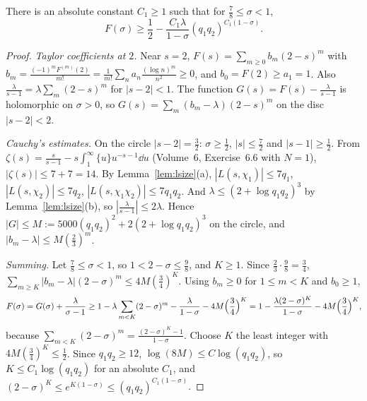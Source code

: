\begin{lemma}\label{lem:Fbound}
There is an absolute constant $C_1\ge1$ such that for $\frac78\le\sigma<1$,
\[
F(\sigma)\ge\frac12-\frac{C_1\lambda}{1-\sigma}(q_1q_2)^{C_1(1-\sigma)}.
\]
\end{lemma}
\begin{proof}
\emph{Taylor coefficients at $2$.} Near $s=2$, $F(s)=\sum_{m\ge0}b_m(2-s)^m$ with $b_m=\frac{(-1)^mF^{(m)}(2)}{m!}=\frac1{m!}\sum_na_n\frac{(\log n)^m}{n^2}\ge0$, and $b_0=F(2)\ge a_1=1$. Also $\frac\lambda{s-1}=\lambda\sum_m(2-s)^m$ for $|s-2|<1$. The function $G(s)=F(s)-\frac\lambda{s-1}$ is holomorphic on $\sigma>0$, so
$G(s)=\sum_m(b_m-\lambda)(2-s)^m$ on the disc $|s-2|<2$.

\emph{Cauchy's estimates.} On the circle $|s-2|=\frac32$: $\sigma\ge\frac12$, $|s|\le\frac72$ and $|s-1|\ge\frac12$. From $\zeta(s)=\frac s{s-1}-s\int_1^\infty\{u\}u^{-s-1}\dd u$ (Volume~6, Exercise~6.6 with $N=1$), $|\zeta(s)|\le7+7=14$. By Lemma~\ref{lem:lsize}(a), $|L(s,\chi_1)|\le7q_1$, $|L(s,\chi_2)|\le7q_2$, $|L(s,\chi_1\chi_2)|\le7q_1q_2$. And $\lambda\le(2+\log q_1q_2)^3$ by Lemma~\ref{lem:lsize}(b), so $|\frac\lambda{s-1}|\le2\lambda$.
Hence $|G|\le M:=5000(q_1q_2)^2+2(2+\log q_1q_2)^3$ on the circle, and $|b_m-\lambda|\le M(\frac23)^m$.

\emph{Summing.} Let $\frac78\le\sigma<1$, so $1<2-\sigma\le\frac98$, and $K\ge1$. Since $\frac23\cdot\frac98=\frac34$, $\sum_{m\ge K}|b_m-\lambda|(2-\sigma)^m\le4M(\frac34)^K$. Using $b_m\ge0$ for $1\le m<K$ and $b_0\ge1$,
\[
F(\sigma)=G(\sigma)+\frac\lambda{\sigma-1}\ge1-\lambda\sum_{m<K}(2-\sigma)^m-\frac\lambda{1-\sigma}-4M\Bigl(\frac34\Bigr)^K=1-\frac{\lambda(2-\sigma)^K}{1-\sigma}-4M\Bigl(\frac34\Bigr)^K,
\]
because $\sum_{m<K}(2-\sigma)^m=\frac{(2-\sigma)^K-1}{1-\sigma}$. Choose $K$ the least integer with $4M(\frac34)^K\le\frac12$. Since $q_1q_2\ge12$, $\log(8M)\le C\log(q_1q_2)$, so $K\le C_1\log(q_1q_2)$ for an absolute $C_1$, and $(2-\sigma)^K\le e^{K(1-\sigma)}\le(q_1q_2)^{C_1(1-\sigma)}$.
\end{proof}

